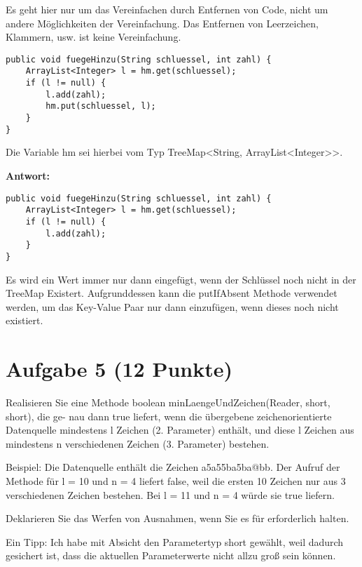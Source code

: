 Es geht hier nur um das Vereinfachen durch Entfernen von Code, nicht um andere
Möglichkeiten der Vereinfachung. Das Entfernen von Leerzeichen, Klammern, usw.
ist keine Vereinfachung.

\begin{lstlisting}
public void fuegeHinzu(String schluessel, int zahl) {
    ArrayList<Integer> l = hm.get(schluessel);
    if (l != null) {
        l.add(zahl);
        hm.put(schluessel, l);
    }
}
\end{lstlisting}

Die Variable hm sei hierbei vom Typ TreeMap<String, ArrayList<Integer>>.

\textbf{Antwort:}

\begin{lstlisting}
public void fuegeHinzu(String schluessel, int zahl) {
    ArrayList<Integer> l = hm.get(schluessel);
    if (l != null) {
        l.add(zahl);
    }
}
\end{lstlisting}

Es wird ein Wert immer nur dann eingefügt, wenn der Schlüssel noch nicht in der
TreeMap Existert. Aufgrunddessen kann die putIfAbsent Methode verwendet werden,
um das Key-Value Paar nur dann einzufügen, wenn dieses noch nicht existiert.

\section{Aufgabe 5 (12 Punkte)}

Realisieren Sie eine Methode boolean minLaengeUndZeichen(Reader, short, short),
die ge- nau dann true liefert, wenn die übergebene zeichenorientierte
Datenquelle mindestens l Zeichen (2. Parameter) enthält, und diese l Zeichen
aus mindestens n verschiedenen Zeichen (3. Parameter) bestehen.

Beispiel: Die Datenquelle enthält die Zeichen a5a55ba5ba@bb. Der Aufruf der
Methode für l = 10 und n = 4 liefert false, weil die ersten 10 Zeichen nur aus
3 verschiedenen Zeichen bestehen. Bei l = 11 und n = 4 würde sie true liefern.

Deklarieren Sie das Werfen von Ausnahmen, wenn Sie es für erforderlich halten.

Ein Tipp: Ich habe mit Absicht den Parametertyp short gewählt, weil dadurch
gesichert ist, dass die aktuellen Parameterwerte nicht allzu groß sein können.

